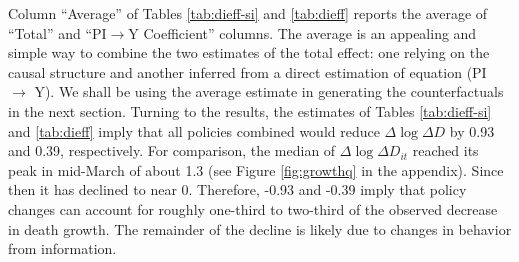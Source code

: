 \documentclass[11pt,reqno,letter]{amsart}
\theoremstyle{definition}
\renewcommand{\to}{{\rightarrow}}
\begin{document}









Column ``Average'' of  Tables \ref{tab:dieff-si} and \ref{tab:dieff}   reports the average of
``Total'' and ``PI$\to$Y Coefficient'' columns.  The average is an appealing and simple way
to combine the two estimates of the total effect: one relying on the causal structure and another inferred from a direct estimation of equation (PI $\to$ Y).
We shall be using the average estimate in generating the counterfactuals in the next section. Turning to the results, the estimates of Tables \ref{tab:dieff-si} and \ref{tab:dieff}  imply that all policies combined would reduce
\(\Delta \log \Delta D\) by  0.93 and  0.39, respectively. For
comparison, the median of \(\Delta \log \Delta D_{it}\) reached its
peak in mid-March of about 1.3 (see Figure \ref{fig:growthq} in the
appendix). Since then it has declined to near 0. Therefore,  -0.93 and -0.39 imply
that policy changes can account for roughly one-third to two-third of the observed
decrease in death growth.  The remainder of the decline is likely due
to changes in behavior from information.
\end{document}
